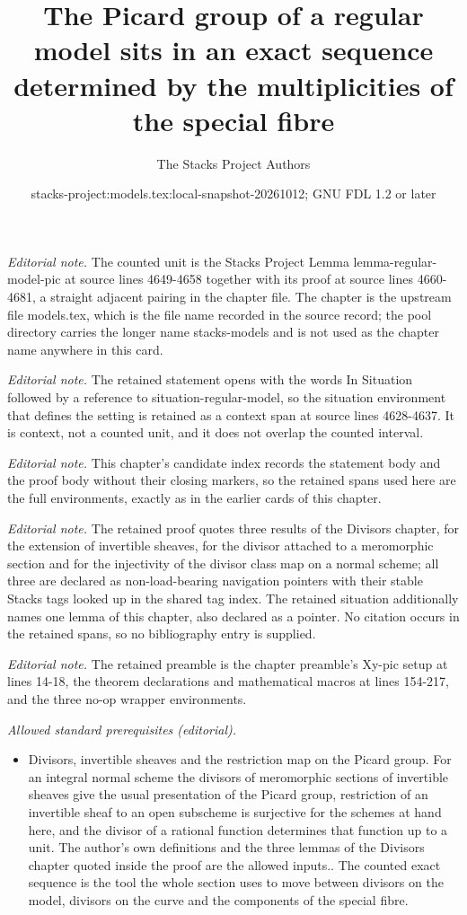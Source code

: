 \documentclass[10pt,a4paper]{amsart}
\title{The Picard group of a regular model sits in an exact sequence determined by the multiplicities of the special fibre}
\author{The Stacks Project Authors}
\date{stacks-project:models.tex:local-snapshot-20261012; GNU FDL 1.2 or later}
\theoremstyle{plain}
\theoremstyle{definition}
\theoremstyle{remark}
\numberwithin{equation}{subsection}
\begin{document}
\maketitle
\noindent\textit{Editorial note.} The counted unit is the Stacks Project Lemma lemma-regular-model-pic at source lines 4649-4658 together with its proof at source lines 4660-4681, a straight adjacent pairing in the chapter file. The chapter is the upstream file models.tex, which is the file name recorded in the source record; the pool directory carries the longer name stacks-models and is not used as the chapter name anywhere in this card.\par\medskip
\noindent\textit{Editorial note.} The retained statement opens with the words In Situation followed by a reference to situation-regular-model, so the situation environment that defines the setting is retained as a context span at source lines 4628-4637. It is context, not a counted unit, and it does not overlap the counted interval.\par\medskip
\noindent\textit{Editorial note.} This chapter's candidate index records the statement body and the proof body without their closing markers, so the retained spans used here are the full environments, exactly as in the earlier cards of this chapter.\par\medskip
\noindent\textit{Editorial note.} The retained proof quotes three results of the Divisors chapter, for the extension of invertible sheaves, for the divisor attached to a meromorphic section and for the injectivity of the divisor class map on a normal scheme; all three are declared as non-load-bearing navigation pointers with their stable Stacks tags looked up in the shared tag index. The retained situation additionally names one lemma of this chapter, also declared as a pointer. No citation occurs in the retained spans, so no bibliography entry is supplied.\par\medskip
\noindent\textit{Editorial note.} The retained preamble is the chapter preamble's Xy-pic setup at lines 14-18, the theorem declarations and mathematical macros at lines 154-217, and the three no-op wrapper environments.\par\medskip
\noindent\textit{Allowed standard prerequisites (editorial).}\begin{itemize}
\item Divisors, invertible sheaves and the restriction map on the Picard group. For an integral normal scheme the divisors of meromorphic sections of invertible sheaves give the usual presentation of the Picard group, restriction of an invertible sheaf to an open subscheme is surjective for the schemes at hand here, and the divisor of a rational function determines that function up to a unit. The author's own definitions and the three lemmas of the Divisors chapter quoted inside the proof are the allowed inputs.. The counted exact sequence is the tool the whole section uses to move between divisors on the model, divisors on the curve and the components of the special fibre.
\end{itemize}\medskip
\end{document}
